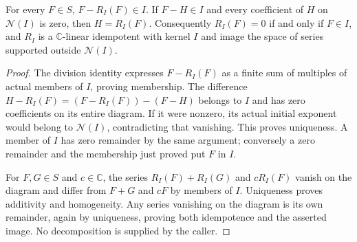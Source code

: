 \begin{theorem}
\label{hir:actual-formal-normal-representative-unique}
\leanok
For every $F\in S$, $F-R_I(F)\in I$. If $F-H\in I$ and every
coefficient of $H$ on $\mathcal N(I)$ is zero, then $H=R_I(F)$.
Consequently $R_I(F)=0$ if and only if $F\in I$, and $R_I$ is a
$\mathbb C$-linear idempotent with kernel $I$ and image the space of
series supported outside $\mathcal N(I)$.
\end{theorem}
\begin{proof}
The division identity expresses $F-R_I(F)$ as a finite sum of multiples
of actual members of $I$, proving membership. The difference
$H-R_I(F)=(F-R_I(F))-(F-H)$ belongs to $I$ and has zero coefficients
on its entire diagram. If it were nonzero, its actual initial exponent
would belong to $\mathcal N(I)$, contradicting that vanishing. This proves
uniqueness. A member of $I$ has zero remainder by the same argument;
conversely a zero remainder and the membership just proved put $F$ in $I$.

For $F,G\in S$ and $c\in\mathbb C$, the series $R_I(F)+R_I(G)$ and
$cR_I(F)$ vanish on the diagram and differ from $F+G$ and $cF$ by members
of $I$. Uniqueness proves additivity and homogeneity. Any series vanishing
on the diagram is its own remainder, again by uniqueness, proving both
idempotence and the asserted image. No decomposition is supplied by the
caller.
\end{proof}

